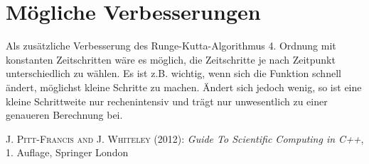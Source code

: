 \documentclass[12pt,a4paper,titlepage,headinclude,bibtotoc]{scrartcl}
\begin{document}
\section{Mögliche Verbesserungen}
Als zusätzliche Verbesserung des Runge-Kutta-Algorithmus 4. Ordnung mit konstanten Zeitschritten wäre es möglich, die Zeitschritte je nach Zeitpunkt unterschiedlich zu wählen.
Es ist z.B. wichtig, wenn sich die Funktion schnell ändert, möglichst kleine Schritte zu machen.
Ändert sich jedoch wenig, so ist eine kleine Schrittweite nur rechenintensiv und trägt nur unwesentlich zu einer genaueren Berechnung bei.

\begin{thebibliography}{1000}

	\textsc{J. Pitt-Francis and J. Whiteley} (2012): \emph{Guide To Scientific Computing in C++},
	1. Auflage, Springer London

\end{thebibliography}
\end{document}
